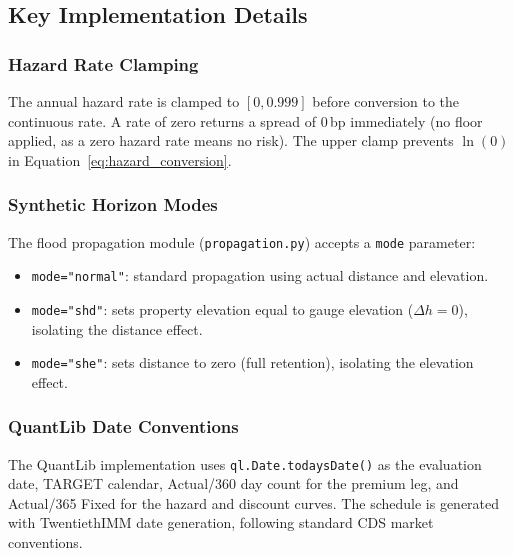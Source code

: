 \documentclass[11pt,a4paper]{article}
\begin{document}
\subsection{Key Implementation Details}

\subsubsection{Hazard Rate Clamping}

The annual hazard rate is clamped to $[0, 0.999]$ before conversion to the continuous
rate. A rate of zero returns a spread of 0\,bp immediately (no floor applied, as a
zero hazard rate means no risk). The upper clamp prevents $\ln(0)$ in
Equation~\eqref{eq:hazard_conversion}.

\subsubsection{Synthetic Horizon Modes}

The flood propagation module (\texttt{propagation.py}) accepts a \texttt{mode} parameter:

\begin{itemize}[nosep]
    \item \texttt{mode="normal"}: standard propagation using actual distance and elevation.
    \item \texttt{mode="shd"}: sets property elevation equal to gauge elevation
          ($\Delta h = 0$), isolating the distance effect.
    \item \texttt{mode="she"}: sets distance to zero (full retention), isolating the
          elevation effect.
\end{itemize}

\subsubsection{QuantLib Date Conventions}

The QuantLib implementation uses \texttt{ql.Date.todaysDate()} as the evaluation date,
TARGET calendar, Actual/360 day count for the premium leg, and Actual/365 Fixed for
the hazard and discount curves. The schedule is generated with TwentiethIMM date
generation, following standard CDS market conventions.


\mkmsensitivity
\end{document}
